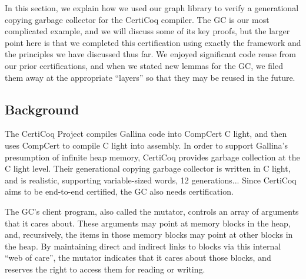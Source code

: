 In this section, we explain how we used our graph library
to verify a generational copying garbage collector for the 
CertiCoq compiler. The GC is our most complicated example,
and we will discuss some of its key proofs, but the larger
point here is that we completed this certification using 
exactly the framework and the principles we have discussed
thus far. {\color{magenta}We enjoyed significant code 
reuse from our prior certifications, and when we stated 
new lemmas for the GC, we filed them away at the appropriate
``layers'' so that they may be reused in the future.}


\subsection{Background}
\label{sec:gcbackground}


The CertiCoq Project compiles Gallina code into CompCert 
C light, and then uses CompCert to compile C light
into assembly. In order to support Gallina's presumption of
infinite heap memory, CertiCoq provides garbage collection at
the C light level. Their generational copying garbage 
collector is written in C light, and is realistic, 
supporting variable-sized words, 12 generations... 
Since CertiCoq aims to be end-to-end certified, the GC 
also needs certification.

The GC's client program, also called the mutator, controls
an array of arguments that it cares about. 
These arguments may point at memory blocks 
in the heap, and, recursively, the items in those
memory blocks may point at other blocks in the heap. 
By maintaining direct and indirect links to
blocks via this internal ``web of care'', 
the mutator indicates that it 
cares about those blocks, and reserves the right to 
access them for reading or writing. 

